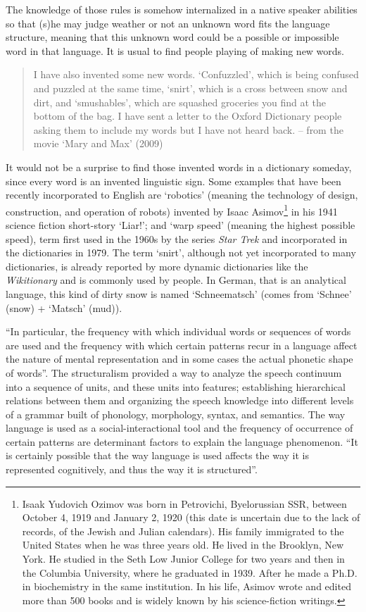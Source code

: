The knowledge of those rules is somehow internalized in a native speaker abilities so that (s)he may judge weather or not an unknown word fits the language structure, meaning that this unknown word could be a possible or impossible word in that language. It is usual to find people playing of making new words. 
\begin{quote}
I have also invented some new words. `Confuzzled', which is being confused and puzzled at the same time, `snirt', which is a cross between snow and dirt, and `smushables', which are squashed groceries you find at the bottom of the bag. I have sent a letter to the Oxford Dictionary people asking them to include my words but I have not heard back. -- from the movie `Mary and Max' (2009) 
\end{quote}
It would not be a surprise to find those invented words in a dictionary someday, since every word is an invented linguistic sign. %
Some examples that have been recently incorporated to English are `robotics' (meaning the technology of design, construction, and operation of robots) 
invented by Isaac Asimov\footnote{Isaak Yudovich Ozimov was born in Petrovichi, Byelorussian SSR, between October 4, 1919 and January 2, 1920 
(this date is uncertain due to the lack of records, of the Jewish and Julian calendars). His family immigrated to the United States when he was 
three years old. He lived in the Brooklyn, New York. He studied in the Seth Low Junior College for two years and then in the Columbia University, 
where he graduated in 1939. After he made a Ph.D. in biochemistry in the same institution. In his life, Asimov wrote and edited more than 500 books 
and is widely known by his science-fiction writings.} in his 1941 science fiction short-story `Liar!'; and `warp speed' (meaning the highest possible speed), 
term first used in the 1960s by the series \textit{Star Trek} and incorporated in the dictionaries in 1979. The term `snirt', although not yet incorporated 
to many dictionaries, is already reported by more dynamic dictionaries like the \textit{Wikitionary} and is commonly used by people. In German, that is 
an analytical language, this kind of dirty snow is named `Schneematsch' (comes from `Schnee' (snow) + `Matsch' (mud)).
 
``In particular, the frequency with which individual words or sequences of words are used and the frequency with which certain patterns recur in a language affect the nature of mental representation and in some cases the actual phonetic shape of words''\citep{bybee2003}. The structuralism provided a way to analyze the speech continuum into a sequence of units, and these units into features; establishing hierarchical relations between them and organizing the speech knowledge into different levels of a grammar built of phonology, morphology, syntax, and semantics. The way language is used as a social-interactional tool and the frequency of occurrence of certain patterns are determinant factors to explain the language phenomenon. ``It is certainly possible that the way language is used affects the way it is represented cognitively, and thus the way it is structured''\citep{bybee2003}.

